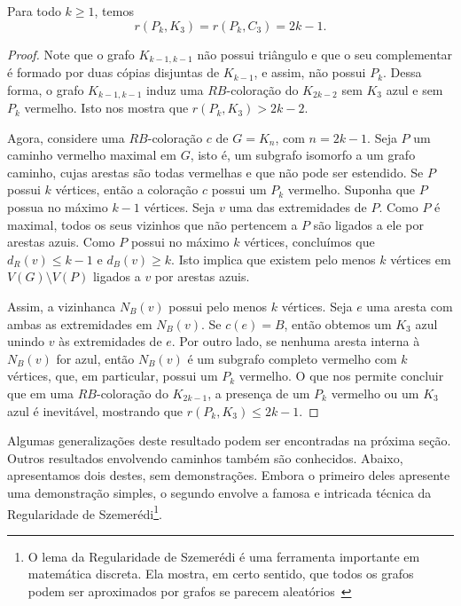 \begin{proposition}
\label{graph:thm:rpt}  Para todo $k \geq 1$, temos
\[r(P_k, K_3) = r(P_k, C_3) = 2k - 1.\]
\end{proposition}
\begin{proof}
Note que o grafo $K_{k-1,k-1}$ não possui triângulo e que o seu complementar é formado por duas cópias disjuntas de $K_{k-1}$, e assim, não possui $P_k$. Dessa forma, o grafo $K_{k-1,k-1}$ induz uma $RB$-coloração do $K_{2k - 2}$ sem $K_3$ azul e sem $P_k$ vermelho. Isto nos mostra que $r(P_k, K_3) > 2k - 2$.

Agora, considere uma $RB$-coloração $c$ de $G=K_n$, com $n = 2k-1$. Seja $P$ um caminho vermelho maximal em $G$, isto é, um subgrafo isomorfo a um grafo caminho, cujas arestas são todas vermelhas e que não pode ser estendido. Se $P$ possui $k$ vértices, então a coloração $c$ possui um $P_k$ vermelho. Suponha que $P$ possua no máximo $k-1$ vértices. Seja $v$ uma das extremidades de $P$.
Como $P$ é maximal, todos os seus vizinhos que não pertencem a $P$ são ligados a ele por arestas azuis. Como $P$ possui no máximo $k$ vértices, concluímos que $d_R(v)\leq k-1$ e $d_B(v)\geq k$. Isto implica que existem pelo menos $k$ vértices em $V(G)\setminus V(P)$ ligados a $v$ por arestas azuis.

Assim, a vizinhanca $N_B(v)$ possui pelo menos $k$ vértices. Seja $e$ uma aresta com ambas as extremidades em $N_B(v)$. Se $c(e) = B$, então obtemos um $K_3$ azul unindo $v$ às extremidades de $e$. Por outro lado, se nenhuma aresta interna à $N_B(v)$ for azul, então $N_B(v)$ é um subgrafo completo vermelho com $k$ vértices, que, em particular, possui um $P_k$ vermelho. O que nos permite concluir que em uma $RB$-coloração do $K_{2k-1}$, a presença de um $P_k$ vermelho ou um $K_3$ azul é inevitável, mostrando que $r(P_k, K_3) \leq 2k-1$.
\end{proof}

Algumas generalizações deste resultado podem ser encontradas na próxima seção. Outros resultados envolvendo caminhos também são conhecidos. Abaixo, apresentamos dois destes, sem demonstrações. Embora o primeiro deles apresente uma demonstração simples, o segundo envolve a famosa e intricada técnica da Regularidade de Szemerédi\footnote{O lema da Regularidade de Szemerédi é uma ferramenta importante em matemática discreta. Ela mostra, em certo sentido, que todos os grafos podem ser aproximados por grafos se parecem aleatórios~\cite{komlos1996szemeredi}}.

